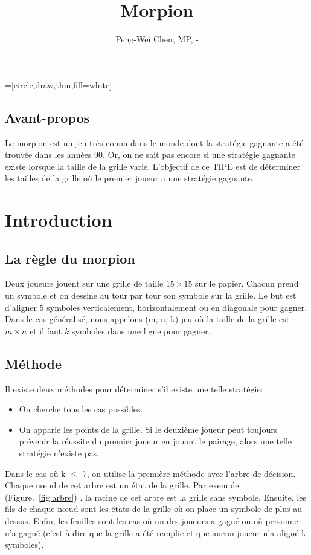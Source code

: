\documentclass{beamer}
\title{Morpion}
\author{Peng-Wei Chen, MP, \oldstylenums{2017}-\oldstylenums{2018}}
\date{}
\begin{document}
=[circle,draw,thin,fill=white]

\begin{frame}
    \maketitle
\end{frame}

\subsection*{Avant-propos}
Le morpion est un jeu très connu dans le monde dont la stratégie gagnante a été trouvée dans les années 90. Or, on ne sait pas encore si une stratégie gagnante existe lorsque la taille de la grille varie. L'objectif de ce TIPE est de déterminer les tailles de la grille où le premier joueur a une stratégie gagnante.

\section{Introduction}
\subsection{La règle du morpion}
Deux joueurs jouent sur une grille de taille $15 \times 15$ sur le papier. Chacun prend un symbole et on dessine au tour par tour son symbole sur la grille. Le but est d'aligner 5 symboles verticalement, horizontalement ou en diagonale pour gagner.
Dans le cas généralisé, nous appelons (m, n, k)-jeu où la taille de la grille est $m \times n$ et il faut $k$ symboles dans une ligne pour gagner.

\subsection{Méthode}
Il existe deux méthodes pour déterminer s'il existe une telle stratégie:
\begin{itemize}
    \item On cherche tous les cas possibles.
    \item On apparie les points de la grille. Si le deuxième joueur peut toujours prévenir la réussite du premier joueur en jouant le pairage, alors une telle stratégie n'existe pas.
\end{itemize}

Dans le cas où k $\le$ 7, on utilise la première méthode avec l'arbre de décision. Chaque nœud de cet arbre est un état de la grille. Par exemple (\mbox{Figure. \ref{fig:arbre}}) , la racine de cet arbre est la grille sans symbole. Ensuite, les fils de chaque nœud sont les états de la grille où on place un symbole de plus au dessus. Enfin, les feuilles sont les cas où un des joueurs a gagné ou où personne n'a gagné (c'est-à-dire que la grille a été remplie et que aucun joueur n'a aligné k symboles).
\end{document}

